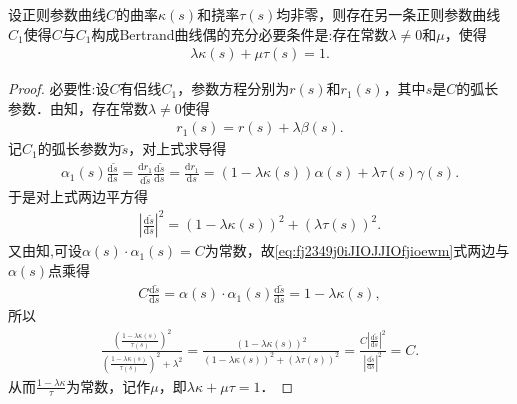 \documentclass[../../main.tex]{subfiles}%
\begin{document}
\begin{theorem}\label{theorem:微分几何-定理7.2}
设正则参数曲线$C$的曲率$\kappa(s)$和挠率$\tau(s)$均非零，则存在另一条正则参数曲线$C_1$使得$C$与$C_1$构成Bertrand曲线偶的充分必要条件是:存在常数$\lambda\neq0$和$\mu$，使得
\begin{align*}
\lambda\kappa(s)+\mu\tau(s)=1.
\end{align*}
\end{theorem}
\begin{proof}

{\heiti 必要性:}设$C$有侣线$C_1$，参数方程分别为$r(s)$和$r_1(s)$，其中$s$是$C$的弧长参数．由知，存在常数$\lambda\neq0$使得
\begin{align*}
r_1(s)=r(s)+\lambda\beta(s).
\end{align*}
记$C_1$的弧长参数为$\tilde{s}$，对上式求导得
\begin{align}\label{eq:fj2349j0iJIOJJIOfjioewm}
\alpha _1\left( s \right) \frac{\mathrm{d}\tilde{s}}{\mathrm{d}s}=\frac{\mathrm{d}r_1}{\mathrm{d}\tilde{s}}\frac{\mathrm{d}\tilde{s}}{\mathrm{d}s}=\frac{\mathrm{d}r_1}{\mathrm{d}s}=\left( 1-\lambda \kappa \left( s \right) \right) \alpha \left( s \right) +\lambda \tau \left( s \right) \gamma \left( s \right) .
\end{align}
于是对上式两边平方得
\begin{align*}
\left| \frac{\mathrm{d}\tilde{s}}{\mathrm{d}s} \right|^2=\left( 1-\lambda \kappa \left( s \right) \right) ^2+\left( \lambda \tau \left( s \right) \right) ^2.
\end{align*}
又由知,可设$\alpha(s)\cdot\alpha_1(s)=C$为常数，故\eqref{eq:fj2349j0iJIOJJIOfjioewm}式两边与$\alpha(s)$点乘得
\begin{align*}
C\frac{\mathrm{d}\tilde{s}}{\mathrm{d}s}=\alpha \left( s \right) \cdot \alpha _1\left( s \right) \frac{\mathrm{d}\tilde{s}}{\mathrm{d}s}=1-\lambda \kappa \left( s \right) ,
\end{align*}
所以
\begin{align*}
\frac{\left( \frac{1-\lambda \kappa \left( s \right)}{\tau \left( s \right)} \right) ^2}{\left( \frac{1-\lambda \kappa \left( s \right)}{\tau \left( s \right)} \right) ^2+\lambda ^2}=\frac{\left( 1-\lambda \kappa \left( s \right) \right) ^2}{\left( 1-\lambda \kappa \left( s \right) \right) ^2+\left( \lambda \tau \left( s \right) \right) ^2}=\frac{C\left| \frac{\mathrm{d}\widetilde{s}}{\mathrm{d}s} \right|^2}{\left| \frac{\mathrm{d}\widetilde{s}}{\mathrm{d}s} \right|^2}=C.
\end{align*}
从而$\frac{1-\lambda\kappa}{\tau}$为常数，记作$\mu$，即$\lambda\kappa+\mu\tau=1$．


\end{proof}
\end{document}
